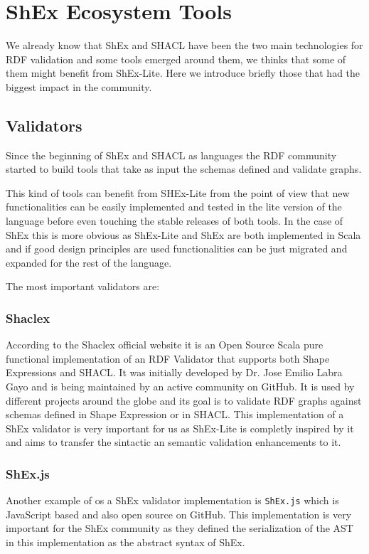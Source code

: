\section{ShEx Ecosystem Tools}

We already know that ShEx and SHACL have been the two main technologies for RDF validation and some tools emerged around them, we thinks that some of them might benefit from ShEx-Lite. Here we introduce briefly those that had the biggest impact in the community.

\subsection{Validators}
Since the beginning of ShEx and SHACL as languages the RDF community started to build tools that take as input the schemas defined and validate graphs.

This kind of tools can benefit from SHEx-Lite from the point of view that new functionalities can be easily implemented and tested in the lite version of the language before even touching the stable releases of both tools. In the case of ShEx this is more obvious as ShEx-Lite and ShEx are both implemented in Scala and if good design principles are used functionalities can be just migrated and expanded for the rest of the language.

The most important validators are:

\subsubsection{Shaclex}
According to the Shaclex official website it is an Open Source Scala pure functional implementation of an RDF Validator that supports both Shape Expressions and SHACL. It was initially developed by Dr. Jose Emilio Labra Gayo and is being maintained by an active community on GitHub. It is used by different projects around the globe and its goal is to validate RDF graphs against schemas defined in Shape Expression or in SHACL.
This implementation of a ShEx validator is very important for us as ShEx-Lite is completly inspired by it and aims to transfer the sintactic an semantic validation enhancements to it.

\subsubsection{ShEx.js}
Another example of os a ShEx validator implementation is \texttt{ShEx.js} which is JavaScript based and also open source on GitHub. This implementation is very important for the ShEx community as they defined the serialization of the AST in this implementation as the abstract syntax of ShEx.



